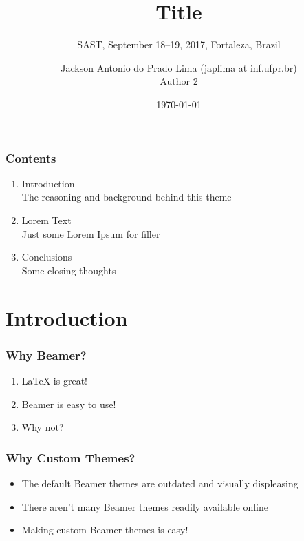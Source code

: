 \documentclass[aspectratio=169]{beamer}
\title{Title}
\author{Jackson Antonio do Prado Lima (japlima at inf.ufpr.br) \\ Author 2}
\date{\today}
\subtitle{\tiny{SAST, September 18--19, 2017, Fortaleza, Brazil}}
\begin{document}
	\setcounter{showProgressBar}{0}
	\setcounter{showSlideNumbers}{0}

	\frame{\titlepage}

	\begin{frame}
		\frametitle{Contents}
		\begin{enumerate}
			\item Introduction \\ \textcolor{ExecusharesGrey}{\footnotesize\hspace{1em} The reasoning and background behind this theme}
			\item Lorem Text  \\ \textcolor{ExecusharesGrey}{\footnotesize\hspace{1em} Just some Lorem Ipsum for filler}
			\item Conclusions \\ \textcolor{ExecusharesGrey}{\footnotesize\hspace{1em} Some closing thoughts}
		\end{enumerate}
	\end{frame}

	\setcounter{framenumber}{0}
	\setcounter{showProgressBar}{1}
	\setcounter{showSlideNumbers}{1}
	
	\section{Introduction}
		\begin{frame}
			\frametitle{Why Beamer?}
			\begin{enumerate}
				\item LaTeX is great!
				\item Beamer is easy to use!
				\item Why not?
			\end{enumerate}
		\end{frame}

		\begin{frame}
			\frametitle{Why Custom Themes?}
			\begin{itemize}
				\item The default Beamer themes are outdated and visually displeasing
				\item There aren't many Beamer themes readily available online
				\item Making custom Beamer themes is easy!
			\end{itemize}
		\end{frame}
\end{document}
